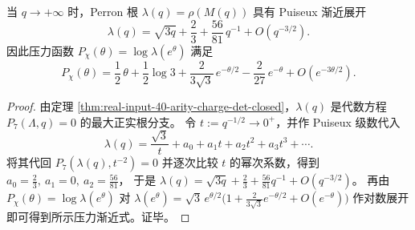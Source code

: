 \begin{proposition}\label{prop:real-input-40-arity-charge-zero-temp-expansion}
当 $q\to+\infty$ 时，Perron 根 $\lambda(q)=\rho(M(q))$ 具有 Puiseux 渐近展开
\[
\lambda(q)=\sqrt{3q}+\frac23+\frac{56}{81}\,q^{-1}+O(q^{-3/2}).
\]
因此压力函数 $P_\chi(\theta)=\log\lambda(e^\theta)$ 满足
\[
P_\chi(\theta)=\frac12\,\theta+\frac12\log 3+\frac{2}{3\sqrt3}\,e^{-\theta/2}-\frac{2}{27}\,e^{-\theta}+O(e^{-3\theta/2}).
\]
\end{proposition}

\begin{proof}
由定理 \ref{thm:real-input-40-arity-charge-det-closed}，$\lambda(q)$ 是代数方程 $P_7(\Lambda,q)=0$ 的最大正实根分支。
令 $t:=q^{-1/2}\to 0^+$，并作 Puiseux 级数代入
\[
\lambda(q)=\frac{\sqrt3}{t}+a_0+a_1t+a_2t^2+a_3t^3+\cdots.
\]
将其代回 $P_7(\lambda(q),t^{-2})=0$ 并逐次比较 $t$ 的幂次系数，得到 $a_0=\frac23,\ a_1=0,\ a_2=\frac{56}{81}$，
于是 $\lambda(q)=\sqrt{3q}+\frac23+\frac{56}{81}q^{-1}+O(q^{-3/2})$。
再由
\(
P_\chi(\theta)=\log\lambda(e^\theta)
\)
对 $\lambda(e^\theta)=\sqrt{3}\,e^{\theta/2}\bigl(1+\frac{2}{3\sqrt3}e^{-\theta/2}+O(e^{-\theta})\bigr)$ 作对数展开即可得到所示压力渐近式。证毕。
\end{proof}
